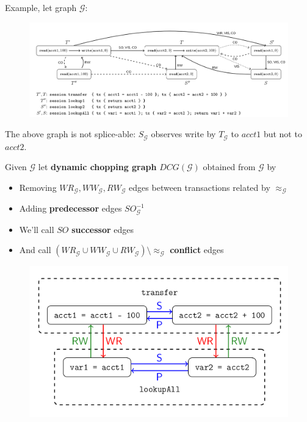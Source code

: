 \documentclass{beamer}
\begin{document}
\begin{frame}
Example, let graph $\mathcal{G}$:
\begin{figure}
	\includegraphics[scale=0.28]{fig4}
\end{figure}
The above graph is not splice-able: $\boxed{S}_\mathcal{G}$ observes write by $\boxed{T}_\mathcal{G}$ to $acct1$ but not to $acct2$.
\end{frame}

\begin{frame}
	Given $\mathcal{G}$ let \textbf{dynamic chopping graph} $DCG(\mathcal{G})$ obtained from $\mathcal{G}$ by
	\begin{itemize}
		\item Removing $WR_\mathcal{G}, WW_\mathcal{G}, RW_\mathcal{G}$ edges between transactions related by $\approx_\mathcal{G}$
		\item Adding \textbf{predecessor} edges $SO^{-1}_\mathcal{G}$
		\item We'll call $SO$ \textbf{successor} edges
		\item And  call $\left( WR_\mathcal{G} \cup WW_\mathcal{G} \cup RW_\mathcal{G} \right) \setminus \approx_\mathcal{G}$ \textbf{conflict} edges
	\end{itemize}
\end{frame}

\begin{frame}
\begin{figure}
	\includegraphics[scale=0.35]{fig5a}
\end{figure}
\end{frame}
\end{document}
